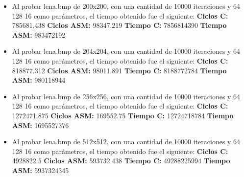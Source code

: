 \documentclass[10pt, a4paper]{article}
\begin{document}
\begin{itemize}
\begin{itemize}
\item{Al probar lena.bmp de 200x200, con una cantidad de 10000 iteraciones y 64 128 16 como parámetros, el tiempo obtenido fue el siguiente: \newline
\newline
\textbf{Ciclos C:}                  785681.438\newline
\vspace{0.15cm}
\textbf{Ciclos ASM:}               98347.219\newline
\textbf{Tiempo C:}                 7856814390\newline
\textbf{Tiempo ASM:}               983472192\newline}

\item{Al probar lena.bmp de 204x204, con una cantidad de 10000 iteraciones y 64 128 16 como parámetros, el tiempo obtenido fue el siguiente: \newline
\newline
\textbf{Ciclos C:}                 818877.312\newline
\vspace{0.15cm}
\textbf{Ciclos ASM:}               98011.891\newline
\textbf{Tiempo C:}                 8188772784\newline
\textbf{Tiempo ASM:}               980118944\newline}

\item{Al probar lena.bmp de 256x256, con una cantidad de 10000 iteraciones y 64 128 16 como parámetros, el tiempo obtenido fue el siguiente: \newline
\newline
\textbf{Ciclos C:}                 1272471.875\newline
\vspace{0.15cm}
\textbf{Ciclos ASM:}               169552.75\newline
\textbf{Tiempo C:}                 12724718784\newline
\textbf{Tiempo ASM:}               1695527376\newline}

\item{Al probar lena.bmp de 512x512, con una cantidad de 10000 iteraciones y 64 128 16 como parámetros, el tiempo obtenido fue el siguiente: \newline
\newline
\textbf{Ciclos C:}                  4928822.5\newline
\vspace{0.15cm}
\textbf{Ciclos ASM:}               593732.438\newline
\textbf{Tiempo C:}                 49288225994\newline
\textbf{Tiempo ASM:}               5937324345\newline}


\end{itemize}
\end{itemize}
\end{document}
